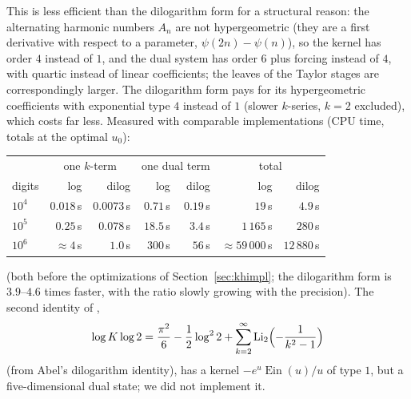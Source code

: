 \documentclass[11pt]{amsart}
\theoremstyle{definition}
\theoremstyle{remark}
\newcommand{\Ein}{\operatorname{Ein}}
\newcommand{\Li}{\operatorname{Li}}
\begin{document}
This is less efficient than the dilogarithm form for a structural reason: the alternating harmonic numbers
$A_n$ are not hypergeometric (they are a first derivative with respect to a parameter, $\psi(2n) - \psi(n)$),
so the kernel has order $4$ instead of $1$, and the dual system has order $6$ plus forcing instead of $4$, with
quartic instead of linear coefficients; the leaves of the Taylor stages are correspondingly larger. The
dilogarithm form pays for its hypergeometric coefficients with exponential type $4$ instead of $1$ (slower
$k$-series, $k = 2$ excluded), which costs far less. Measured with comparable implementations (CPU time, totals at the
optimal $u_0$):
\begin{center}
\begin{tabular}{lrrrrrr}
\toprule
 & \multicolumn{2}{c}{one $k$-term} & \multicolumn{2}{c}{one dual term} & \multicolumn{2}{c}{total} \\
digits & log & dilog & log & dilog & log & dilog \\
\midrule
$10^4$ & $0.018$\,s & $0.0073$\,s & $0.71$\,s & $0.19$\,s & $19$\,s & $4.9$\,s \\
$10^5$ & $0.25$\,s & $0.078$\,s & $18.5$\,s & $3.4$\,s & $1\,165$\,s & $280$\,s \\
$10^6$ & $\approx 4$\,s & $1.0$\,s & $300$\,s & $56$\,s & $\approx 59\,000$\,s & $12\,880$\,s \\
\bottomrule
\end{tabular}
\end{center}
(both before the optimizations of Section~\ref{sec:khimpl}; the dilogarithm form is $3.9$--$4.6$ times faster, with
the ratio slowly growing with the precision). The second identity of \cite[\S3]{BBC97},
\[
  \log K\log2 = \frac{\pi^2}{6} - \frac12\log^22 + \sum_{k=2}^{\infty}\Li_2\Bigl(-\frac1{k^2-1}\Bigr)
\]
(from Abel's dilogarithm identity), has a
kernel $-e^u\Ein(u)/u$ of type $1$, but a five-dimensional dual state; we did not implement it.
\end{document}
